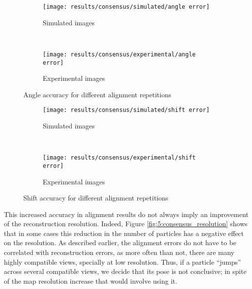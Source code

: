 \documentclass[../main.tex]{subfiles}
\begin{document}
\begin{figure}[htbp]
    \centering
    \begin{subfigure}[b]{.8\textwidth}
         \centering
         \texttt{[image: results/consensus/simulated/angle error]}
         \caption{Simulated images}
    \end{subfigure}\\
    \vspace{2em}
    \begin{subfigure}[b]{.8\textwidth}
         \centering
         \texttt{[image: results/consensus/experimental/angle error]}
         \caption{Experimental images}
    \end{subfigure}
    \caption{Angle accuracy for different alignment repetitions}
    \label{fig:5:consensus_angle_accuracy}
\end{figure}

\begin{figure}[htbp]
    \centering
    \begin{subfigure}[b]{.8\textwidth}
         \centering
         \texttt{[image: results/consensus/simulated/shift error]}
         \caption{Simulated images}
    \end{subfigure}\\
    \vspace{2em}
    \begin{subfigure}[b]{.8\textwidth}
         \centering
         \texttt{[image: results/consensus/experimental/shift error]}
         \caption{Experimental images}
    \end{subfigure}
    \caption{Shift accuracy for different alignment repetitions}
    \label{fig:5:consensus_shift_accuracy}
\end{figure}

This increased accuracy in alignment results do not always imply an improvement of the reconstruction resolution. Indeed, Figure \ref{fig:5:consensus_resolution} shows that in some cases this reduction in the number of particles has a negative effect on the resolution. As described earlier, the alignment errors do not have to be correlated with reconstruction errors, as more often than not, there are many highly compatible views, specially at low resolution. Thus, if a particle ``jumps'' across several compatible views, we decide that its pose is not conclusive; in spite of the map resolution increase that would involve using it.
\end{document}
